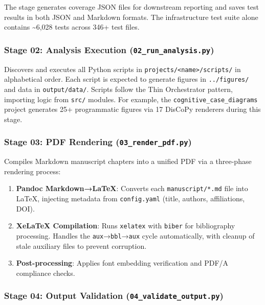 \documentclass[
]{article}
\providecommand{\tightlist}{%
  \setlength{\itemsep}{0pt}\setlength{\parskip}{0pt}}
\begin{document}
The stage generates coverage JSON files for downstream reporting and
saves test results in both JSON and Markdown formats. The infrastructure
test suite alone contains \textasciitilde6,028 tests across 346+ test
files.

\subsubsection{\texorpdfstring{Stage 02: Analysis Execution
(\texttt{02\_run\_analysis.py})}{Stage 02: Analysis Execution (02\_run\_analysis.py)}}\label{stage-02-analysis-execution-02_run_analysis.py}

Discovers and executes all Python scripts in
\texttt{projects/\textless{}name\textgreater{}/scripts/} in alphabetical
order. Each script is expected to generate figures in
\texttt{../figures/} and data in \texttt{output/data/}. Scripts follow
the Thin Orchestrator pattern, importing logic from \texttt{src/}
modules. For example, the \texttt{cognitive\_case\_diagrams} project
generates 25+ programmatic figures via 17 DisCoPy renderers during this
stage.

\subsubsection{\texorpdfstring{Stage 03: PDF Rendering
(\texttt{03\_render\_pdf.py})}{Stage 03: PDF Rendering (03\_render\_pdf.py)}}\label{stage-03-pdf-rendering-03_render_pdf.py}

Compiles Markdown manuscript chapters into a unified PDF via a
three-phase rendering process:

\begin{enumerate}
\def\labelenumi{\arabic{enumi}.}
\tightlist
\item
  \textbf{Pandoc Markdown→LaTeX}: Converts each \texttt{manuscript/*.md}
  file into LaTeX, injecting metadata from \texttt{config.yaml} (title,
  authors, affiliations, DOI).
\item
  \textbf{XeLaTeX Compilation}: Runs \texttt{xelatex} with
  \texttt{biber} for bibliography processing. Handles the
  \texttt{aux}→\texttt{bbl}→\texttt{aux} cycle automatically, with
  cleanup of stale auxiliary files to prevent corruption.
\item
  \textbf{Post-processing}: Applies font embedding verification and
  PDF/A compliance checks.
\end{enumerate}

\subsubsection{\texorpdfstring{Stage 04: Output Validation
(\texttt{04\_validate\_output.py})}{Stage 04: Output Validation (04\_validate\_output.py)}}\label{stage-04-output-validation-04_validate_output.py}
\end{document}
